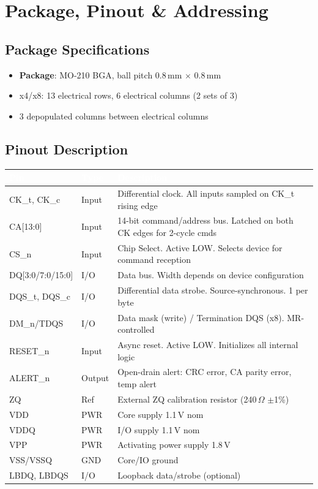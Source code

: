 \documentclass[10pt,a4paper,twoside]{article}
\newcommand{\thd}[1]{\cellcolor{navyblue}\textcolor{white}{\textbf{#1}}}
\newcommand{\trow}{\rowcolor{lightgray}}
\newcommand{\talt}{\rowcolor{skyblue!30}}
\begin{document}
\section{Package, Pinout \& Addressing}

\subsection{Package Specifications}

\begin{itemize}
  \item \textbf{Package}: MO-210 BGA, ball pitch 0.8\,mm $\times$ 0.8\,mm
  \item x4/x8: 13 electrical rows, 6 electrical columns (2 sets of 3)
  \item 3 depopulated columns between electrical columns
\end{itemize}

\subsection{Pinout Description}

\begin{center}
\begin{tabularx}{\linewidth}{@{} l l X @{}}
\toprule
\thd{Pin} & \thd{Type} & \thd{Description} \\
\midrule
\trow CK\_t, CK\_c & Input & Differential clock. All inputs sampled on CK\_t rising edge \\
\talt CA[13:0] & Input & 14-bit command/address bus. Latched on both CK edges for 2-cycle cmds \\
\trow CS\_n & Input & Chip Select. Active LOW. Selects device for command reception \\
\talt DQ[3:0/7:0/15:0] & I/O & Data bus. Width depends on device configuration \\
\trow DQS\_t, DQS\_c & I/O & Differential data strobe. Source-synchronous. 1 per byte \\
\talt DM\_n/TDQS & I/O & Data mask (write) / Termination DQS (x8). MR-controlled \\
\trow RESET\_n & Input & Async reset. Active LOW. Initializes all internal logic \\
\talt ALERT\_n & Output & Open-drain alert: CRC error, CA parity error, temp alert \\
\trow ZQ & Ref & External ZQ calibration resistor (240\,$\Omega$ $\pm$1\%) \\
\talt VDD & PWR & Core supply 1.1\,V nom \\
\trow VDDQ & PWR & I/O supply 1.1\,V nom \\
\talt VPP & PWR & Activating power supply 1.8\,V \\
\trow VSS/VSSQ & GND & Core/IO ground \\
\talt LBDQ, LBDQS & I/O & Loopback data/strobe (optional) \\
\bottomrule
\end{tabularx}
\end{center}
\end{document}
